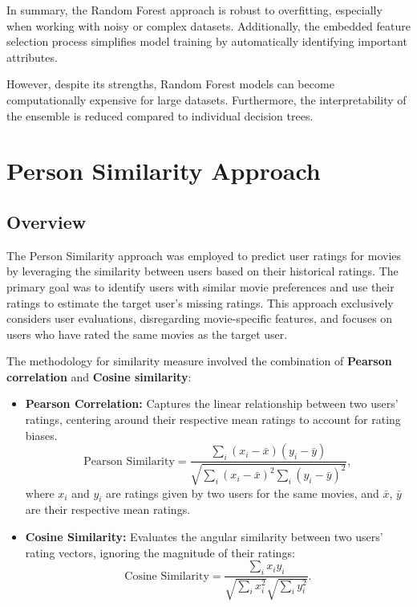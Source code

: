 \documentclass[a4paper,9pt]{article}
\begin{document}
In summary, the Random Forest approach is robust to overfitting,
especially when working with noisy or complex datasets.
Additionally, the embedded feature selection process simplifies model training
by automatically identifying important attributes.

However, despite its strengths, Random Forest models can become computationally expensive for large datasets.
Furthermore, the interpretability of the ensemble is reduced compared to individual decision trees.

\clearpage
\section{Person Similarity Approach}
\subsection{Overview}
The Person Similarity approach was employed to predict user ratings for movies by leveraging the similarity
between users based on their historical ratings.
The primary goal was to identify users with similar movie preferences and use their ratings to estimate
the target user's missing ratings.
This approach exclusively considers user evaluations, disregarding movie-specific features, and focuses
on users who have rated the same movies as the target user.

The methodology for similarity measure involved the combination of \textbf{Pearson correlation} and \textbf{Cosine similarity}:

\begin{itemize}
	\item \textbf{Pearson Correlation:} Captures the linear relationship between two users' ratings, centering around their respective mean ratings to account for rating biases.
	      \begin{equation}
		      \text{Pearson Similarity} = \frac{\sum_{i} (x_i - \bar{x})(y_i - \bar{y})}{\sqrt{\sum_{i} (x_i - \bar{x})^2 \sum_{i} (y_i - \bar{y})^2}},
	      \end{equation}
	      where \( x_i \) and \( y_i \) are ratings given by two users for the same movies, and \( \bar{x} \), \( \bar{y} \) are their respective mean ratings.

	\item \textbf{Cosine Similarity:} Evaluates the angular similarity between two users' rating vectors, ignoring the magnitude of their ratings:
	      \begin{equation}
		      \text{Cosine Similarity} = \frac{\sum_{i} x_i y_i}{\sqrt{\sum_{i} x_i^2} \sqrt{\sum_{i} y_i^2}}.
	      \end{equation}
\end{itemize}
\end{document}
